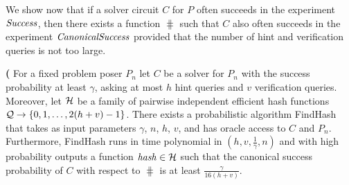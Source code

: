 We show now that if a solver circuit $C$ for $P$ often succeeds in the experiment $\operatorname{\mathit{Success}}$,
then there exists a function $\hash$ such that $C$ also often succeeds in the experiment $\operatorname{\mathit{CanonicalSuccess}}$
provided that the number of hint and verification queries is not too large.
%
\begin{lemma}\textbf{(}
\label{lemma:hash_function_probability}
For a fixed problem poser $P_n$ let $C$ be a solver for $P_n$ with the success probability at least $\gamma$,
asking at most $h$ hint queries and $v$ verification queries.
Moreover, let $\mathcal{H}$ be a family of pairwise independent efficient hash functions $\mathcal{Q} \rightarrow \{0,1, \dots,2(h+v)-1\}$.
There exists a probabilistic algorithm FindHash that takes as input parameters $\gamma$, $n$, $h$, $v$, and has oracle access to $C$ and $P_n$.
Furthermore, FindHash runs in time polynomial in $(h,v,\frac{1}{\gamma},n)$ and with high probability outputs a function $\operatorname{\mathit{hash}} \in \mathcal{H}$
such that the canonical success probability of $C$ with respect to $\hash$ is at least $\frac{\gamma}{16(h+v)}$.
\end{lemma}
%
